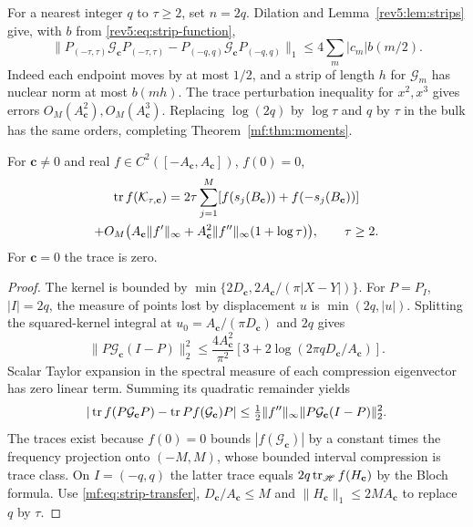 For a nearest integer $q$ to $\tau\ge2$, set $n=2q$.
Dilation and Lemma~\ref{rev5:lem:strips} give, with $b$ from
\eqref{rev5:eq:strip-function},
\begin{equation}\label{mf:eq:strip-transfer}
 \|P_{(-\tau,\tau)}\mathcal G_{\mathbf c}P_{(-\tau,\tau)}
       -P_{(-q,q)}\mathcal G_{\mathbf c}P_{(-q,q)}\|_1
 \le4\sum_m|c_m|b(m/2).
\end{equation}
Indeed each endpoint moves by at most $1/2$, and a strip of length $h$
for $\mathcal G_m$ has nuclear norm at most $b(mh)$.
The trace perturbation inequality for $x^2,x^3$ gives errors
$O_M(A_{\mathbf c}^2),O_M(A_{\mathbf c}^3)$.
Replacing $\log(2q)$ by $\log\tau$ and $q$ by $\tau$ in the bulk has the
same orders, completing Theorem~\ref{mf:thm:moments}.

\begin{proposition}\label{mf:prop:first-order}
For $\mathbf c\ne0$ and real $f\in C^2([-A_{\mathbf c},A_{\mathbf c}])$,
$f(0)=0$,
\begin{multline}\label{mf:eq:first-order}
 \operatorname{tr} f(\mathcal K_{\tau,\mathbf c})
 =2\tau\sum_{j=1}^M[f(s_j(B_{\mathbf c}))+f(-s_j(B_{\mathbf c}))]\\
 +O_M\bigl(A_{\mathbf c}\|f'\|_\infty+
 A_{\mathbf c}^2\|f''\|_\infty(1+\log\tau)\bigr),\qquad\tau\ge2.
\end{multline}
For $\mathbf c=0$ the trace is zero.
\end{proposition}
\begin{proof}
The kernel is bounded by
$\min\{2D_{\mathbf c},2A_{\mathbf c}/(\pi|X-Y|)\}$.
For $P=P_I$, $|I|=2q$, the measure of points lost by displacement $u$
is $\min(2q,|u|)$. Splitting the squared-kernel integral at
$u_0=A_{\mathbf c}/(\pi D_{\mathbf c})$ and $2q$ gives
\[
 \|P\mathcal G_{\mathbf c}(I-P)\|_2^2
 \le\frac{4A_{\mathbf c}^2}{\pi^2}
 [3+2\log(2\pi qD_{\mathbf c}/A_{\mathbf c})].
\]
Scalar Taylor expansion in the spectral measure of each compression
eigenvector has zero linear term. Summing its quadratic remainder yields
\[
 |\operatorname{tr} f(P\mathcal G_{\mathbf c}P)-\operatorname{tr} P f(\mathcal G_{\mathbf c})P|
 \le\tfrac12\|f''\|_\infty\|P\mathcal G_{\mathbf c}(I-P)\|_2^2.
\]
The traces exist because $f(0)=0$ bounds $|f(\mathcal G_{\mathbf c})|$
by a constant times the frequency projection onto $(-M,M)$, whose bounded
interval compression is trace class. On $I=(-q,q)$ the latter trace equals
$2q\operatorname{tr}_{\mathscr H}f(H_{\mathbf c})$ by the Bloch formula.
Use \eqref{mf:eq:strip-transfer},
$D_{\mathbf c}/A_{\mathbf c}\le M$ and
$\|H_{\mathbf c}\|_1\le2MA_{\mathbf c}$ to replace $q$ by $\tau$.
\end{proof}

